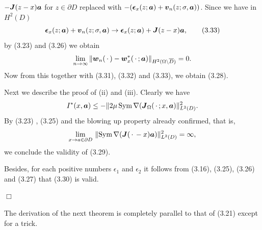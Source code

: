$-\mbox{\boldmath $J$}(z-x)\mbox{\boldmath $a$}$ for $z\in\partial D$ replaced with $-(\mbox{\boldmath $\epsilon$}_x(z;\mbox{\boldmath $a$})+\mbox{\boldmath $v$}_n(z;\sigma,\mbox{\boldmath $a$}))$.
Since we have in $H^{2}(D)$
$$\displaystyle
\mbox{\boldmath $\epsilon$}_x(z;\mbox{\boldmath $a$})+\mbox{\boldmath $v$}_n(z;\sigma,\mbox{\boldmath $a$})
\rightarrow
\mbox{\boldmath $\epsilon$}_x(z;\mbox{\boldmath $a$})+\mbox{\boldmath $J$}(z-x)\mbox{\boldmath $a$},
\tag {3.33}
$$
by (3.23) and (3.26) we obtain
$$\displaystyle
\lim_{n\rightarrow\infty}\Vert\mbox{\boldmath $w$}_n(\,\cdot\,)-\mbox{\boldmath $w$}_x^*(\,\cdot\,;\mbox{\boldmath $a$})\Vert_{H^2(\Omega\setminus\overline{D})}=0.
$$
Now from this together with (3.31), (3.32) and (3.33), we obtain (3.28).

Next we describe the proof of (ii) and (iii).   Clearly we have
$$\displaystyle
I^*(x,\mbox{\boldmath $a$})\le
-\Vert 2\mu\,\text{Sym}\,\nabla(\mbox{\boldmath $J$}_{\Omega}(\,\cdot\,;x,\mbox{\boldmath $a$})\Vert_{L^2(D)}^2.
$$
By  (3.23) , (3.25) and the blowing up property already confirmed, that is, 
$$\displaystyle
\lim_{x\rightarrow a\in\partial D}\,\Vert\text{Sym}\,\nabla(\mbox{\boldmath $J$}(\,\cdot\,-x)\mbox{\boldmath $a$)}\Vert_{L^2(D)}^2=\infty,
$$
we conclude the validity of (3.29).

\noindent
Besides, for each positive numbers $\epsilon_1$ and $\epsilon_2$ it follows from (3.16), (3.25), (3.26)
and (3.27) that (3.30) is valid.



 






\noindent
$\Box$






The derivation of the next theorem is completely parallel to that of  (3.21)
except for a trick.
  

